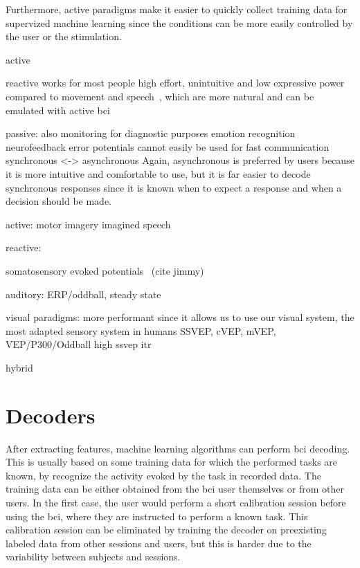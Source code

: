 Furthermore, active paradigms make it easier to quickly collect training data for
supervized machine learning since the conditions can be more easily controlled
by the user or the stimulation.

active

reactive
works for most people
high effort, unintuitive and low expressive power compared to movement and
speech~\cite{Zander2011}, which are more natural and can be emulated with active bci

passive:
also monitoring for diagnostic purposes
emotion recognition
neurofeedback
error potentials
cannot easily be used for fast communication
synchronous <-> asynchronous
Again, asynchronous is preferred by users because it is more intuitive and
comfortable to use, but it is far easier to decode synchronous responses since
it is known when to expect a response and when a decision should be made.

active:
motor imagery
imagined speech

reactive:

somatosensory evoked potentials~\cite{Petit2021} (cite jimmy)

auditory:
ERP/oddball, steady state

visual paradigms:
more performant since it allows us to use our visual system, the most adapted
sensory system in humans
SSVEP, cVEP, mVEP, VEP/P300/Oddball
high ssvep itr

hybrid

\section{Decoders}
\label{sec:bci-decoders}

After extracting features, machine learning algorithms can perform \ac{bci}
decoding.
This is usually based on
some training data for which the performed tasks are known, by recognize the
activity evoked by the task in recorded data.
The training data can be either obtained from the \ac{bci} user themselves or from
other users.
In the first case, the user would perform a short calibration session before
using the \ac{bci}, where they are instructed to perform a known task.
This calibration session can be eliminated by training the decoder on
preexisting labeled data from other sessions and users, but this is harder due
to the variability between subjects and sessions.

